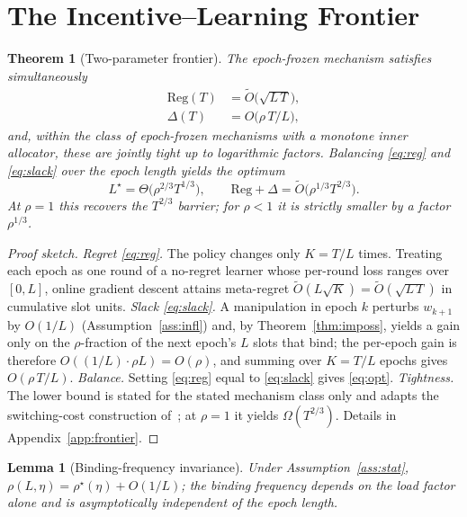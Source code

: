 \documentclass[conference]{IEEEtran}
\newtheorem{theorem}{Theorem}
\newtheorem{lemma}{Lemma}
\theoremstyle{definition}
\theoremstyle{remark}
\newcommand{\Slots}{T}
\newcommand{\Ep}{L}
\newcommand{\Neps}{K}
\newcommand{\rhobind}{\rho}
\newcommand{\load}{\eta}
\newcommand{\wt}{w}
\newcommand{\Reg}{\mathrm{Reg}}
\newcommand{\Slack}{\Delta}
\newcommand{\Otil}{\tilde{O}}
\begin{document}
\section{The Incentive--Learning Frontier}\label{sec:frontier}

\begin{theorem}[Two-parameter frontier]\label{thm:frontier}
The epoch-frozen mechanism satisfies simultaneously
\begin{align}
\Reg(\Slots)&=\Otil\!\big(\sqrt{\Ep\,\Slots}\big),\label{eq:reg}\\
\Slack(\Slots)&=O\!\big(\rhobind\,\Slots/\Ep\big),\label{eq:slack}
\end{align}
and, within the class of epoch-frozen mechanisms with a monotone inner allocator, these are jointly tight up to logarithmic factors. Balancing \eqref{eq:reg} and \eqref{eq:slack} over the epoch length yields the optimum
\begin{equation}\label{eq:opt}
\Ep^\star=\Theta\!\big(\rhobind^{2/3}\Slots^{1/3}\big),\qquad
\Reg+\Slack=\Otil\!\big(\rhobind^{1/3}\Slots^{2/3}\big).
\end{equation}
At $\rhobind=1$ this recovers the $\Slots^{2/3}$ barrier; for $\rhobind<1$ it is strictly smaller by a factor $\rhobind^{1/3}$.
\end{theorem}

\begin{proof}[Proof sketch]
\emph{Regret \eqref{eq:reg}.} The policy changes only $\Neps=\Slots/\Ep$ times. Treating each epoch as one round of a no-regret learner whose per-round loss ranges over $[0,\Ep]$, online gradient descent attains meta-regret $\Otil(\Ep\sqrt{\Neps})=\Otil(\sqrt{\Ep\,\Slots})$ in cumulative slot units.
\emph{Slack \eqref{eq:slack}.} A manipulation in epoch $k$ perturbs $\wt_{k+1}$ by $O(1/\Ep)$ (Assumption~\ref{ass:infl}) and, by Theorem~\ref{thm:imposs}, yields a gain only on the $\rhobind$-fraction of the next epoch's $\Ep$ slots that bind; the per-epoch gain is therefore $O((1/\Ep)\cdot\rhobind\Ep)=O(\rhobind)$, and summing over $\Neps=\Slots/\Ep$ epochs gives $O(\rhobind\,\Slots/\Ep)$.
\emph{Balance.} Setting \eqref{eq:reg} equal to \eqref{eq:slack} gives \eqref{eq:opt}.
\emph{Tightness.} The lower bound is stated for the stated mechanism class only and adapts the switching-cost construction of~\cite{ref:dekel}; at $\rhobind=1$ it yields $\Omega(\Slots^{2/3})$. Details in Appendix~\ref{app:frontier}.
\end{proof}

\begin{lemma}[Binding-frequency invariance]\label{lem:invariance}
Under Assumption~\ref{ass:stat}, $\rhobind(\Ep,\load)=\rhobind^\star(\load)+O(1/\Ep)$; the binding frequency depends on the load factor alone and is asymptotically independent of the epoch length.
\end{lemma}
\end{document}
